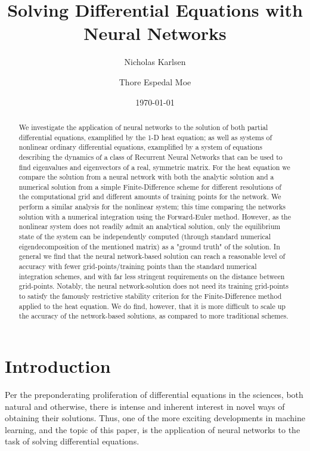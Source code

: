 \documentclass[reprint, english, nofootinbib]{revtex4-2}
\begin{document}
\title{Solving Differential Equations with Neural Networks}
\author{Nicholas Karlsen}
\author{Thore Espedal Moe}
\date{\today}

\begin{abstract}
    \noindent
    We investigate the application of neural networks to the solution of both partial differential equations, examplified by the 1-D heat equation; as well as systems of nonlinear ordinary differential equations, examplified by a system of equations describing the dynamics of a class of Recurrent Neural Networks that can be used to find eigenvalues and eigenvectors of a real, symmetric matrix. For the heat equation we compare the solution from a neural network with both the analytic solution and a numerical solution from a simple Finite-Difference scheme for different resolutions of the computational grid and different amounts of training points for the network. We perform a similar analysis for the nonlinear system; this time comparing the networks solution with a numerical integration using the Forward-Euler method. However, as the nonlinear system does not readily admit an analytical solution, only the equilibrium state of the system can be independently computed (through standard numerical eigendecomposition of the mentioned matrix) as a "ground truth" of the solution. In general we find that the neural network-based solution can reach a reasonable level of accuracy with fewer grid-points/training points than the standard numerical integration schemes, and with far less stringent requirements on the distance between grid-points. Notably, the neural network-solution does not need its training grid-points to satisfy the famously restrictive stability criterion for the Finite-Difference method applied to the heat equation. We do find, however, that it is more difficult to scale up the accuracy of the network-based solutions, as compared to more traditional schemes.
\end{abstract}

\maketitle

\section{Introduction}
\noindent
Per the preponderating proliferation of differential equations in the sciences, both natural and otherwise, there is intense and inherent interest in novel ways of obtaining their solutions. Thus, one of the more exciting developments in machine learning, and the topic of this paper, is the application of neural networks to the task of solving differential equations. 
\end{document}
